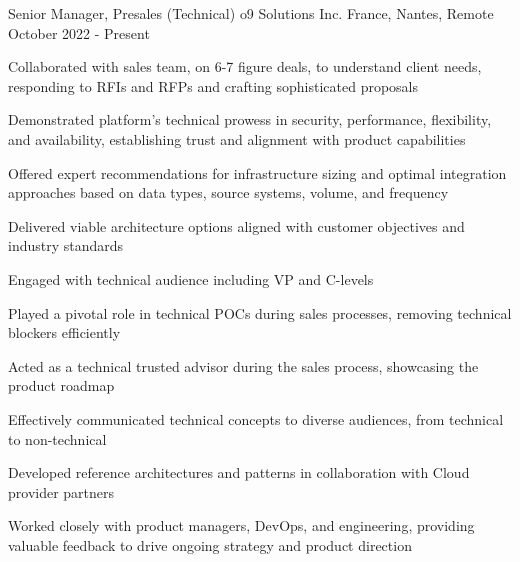

\begin{cventries}

  \cventry
    {Senior Manager, Presales (Technical)}
    {o9 Solutions Inc.}
    {France, Nantes, Remote}
    {October 2022 - Present}
    {
      \begin{cvitems}
        \item {Collaborated with sales team, on 6-7 figure deals, to understand client needs, responding to RFIs and RFPs and crafting sophisticated proposals}
        \item {Demonstrated platform's technical prowess in security, performance, flexibility, and availability, establishing trust and alignment with product capabilities}
        \item {Offered expert recommendations for infrastructure sizing and optimal integration approaches based on data types, source systems, volume, and frequency}
        \item {Delivered viable architecture options aligned with customer objectives and industry standards}
        \item {Engaged with technical audience including VP and C-levels}
        \item {Played a pivotal role in technical POCs during sales processes, removing technical blockers efficiently}
        \item {Acted as a technical trusted advisor during the sales process, showcasing the product roadmap}
        \item {Effectively communicated technical concepts to diverse audiences, from technical to non-technical}
        \item {Developed reference architectures and patterns in collaboration with Cloud provider partners}
        \item {Worked closely with product managers, DevOps, and engineering, providing valuable feedback to drive ongoing strategy and product direction}
      \end{cvitems}
    }


\end{cventries}
